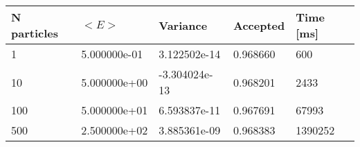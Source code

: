 \begin{table}[h!]
\begin{tabular}{|l|l|l|l|l|}
\hline 
N particles & $<E>$ & Variance & Accepted & Time [ms]\\ 
 \hline 
1 & 5.000000e-01 & 3.122502e-14 & 0.968660 & 600 \\ \hline 
10 & 5.000000e+00 & -3.304024e-13 & 0.968201 & 2433 \\ \hline 
100 & 5.000000e+01 & 6.593837e-11 & 0.967691 & 67993 \\ \hline 
500 & 2.500000e+02 & 3.885361e-09 & 0.968383 & 1390252 \\ \hline 
\end{tabular}
\label{h:n1} 
\end{table}
